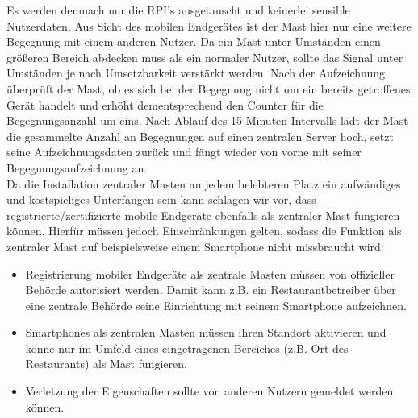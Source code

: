 \documentclass[conference]{IEEEtran}
\begin{document}
Es werden demnach nur die RPI's ausgetauscht und keinerlei sensible Nutzerdaten. 
Aus Sicht des mobilen Endgerätes ist der Mast hier nur eine weitere Begegnung mit einem anderen Nutzer. 
Da ein Mast unter Umständen einen größeren Bereich abdecken muss als ein normaler Nutzer, sollte das Signal unter Umständen je nach Umsetzbarkeit verstärkt werden. 
Nach der Aufzeichnung überprüft der Mast, ob es sich bei der Begegnung nicht um ein bereits getroffenes Gerät handelt und erhöht dementsprechend den Counter für die Begegnungsanzahl um eins. 
Nach Ablauf des 15 Minuten Intervalls lädt der Mast die gesammelte Anzahl an Begegnungen auf einen zentralen Server hoch, setzt seine Aufzeichnungsdaten zurück und  fängt wieder von vorne mit seiner Begegnungsaufzeichnung an. \\

Da die Installation zentraler Masten an jedem belebteren Platz ein aufwändiges und kostspieliges Unterfangen sein kann schlagen wir vor, dass registrierte/zertifizierte mobile Endgeräte ebenfalls als zentraler Mast fungieren können. 
Hierfür müssen jedoch Einschränkungen gelten, sodass die Funktion als zentraler Mast auf beispielsweise einem Smartphone nicht missbraucht wird:
\begin{itemize}
	\item Registrierung mobiler Endgeräte als zentrale Masten müssen von offizieller Behörde autorisiert werden. Damit kann z.B. ein Restaurantbetreiber über eine zentrale Behörde seine Einrichtung mit seinem Smartphone aufzeichnen. 
	\item Smartphones als zentralen Masten müssen ihren Standort aktivieren und könne nur im Umfeld eines eingetragenen Bereiches (z.B. Ort des Restaurants) als Mast fungieren. 
	\item Verletzung der Eigenschaften sollte von anderen Nutzern gemeldet werden können. 
\end{itemize}
\end{document}

